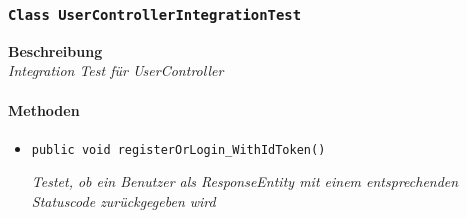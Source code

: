  \subsubsection{\texttt{Class UserControllerIntegrationTest}}
 \textbf{Beschreibung} \\
 \textit{Integration Test für UserController}
 \paragraph*{Methoden}
 \begin{itemize}
 	\item{\texttt{public void registerOrLogin\_WithIdToken()}}
 	
 	\textit{Testet, ob ein Benutzer als ResponseEntity mit einem entsprechenden Statuscode zurückgegeben wird}
 \end{itemize}